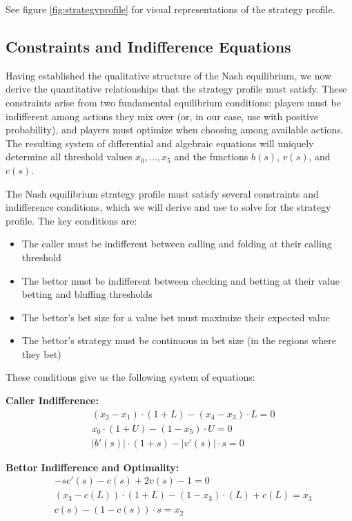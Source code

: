 \documentclass[../../main/main.tex]{subfiles}
\begin{document}
See figure \ref{fig:strategyprofile} for visual representations of the strategy profile.

\subsection{Constraints and Indifference Equations}
\label{subsec:constraints}

Having established the qualitative structure of the Nash equilibrium, we now derive the quantitative relationships that the strategy profile must satisfy. These constraints arise from two fundamental equilibrium conditions: players must be indifferent among actions they mix over (or, in our case, use with positive probability), and players must optimize when choosing among available actions. The resulting system of differential and algebraic equations will uniquely determine all threshold values $x_0, \ldots, x_5$ and the functions $b(s)$, $v(s)$, and $c(s)$.

The Nash equilibrium strategy profile must satisfy several constraints and indifference conditions, which we will derive and use to solve for the strategy profile. The key conditions are:

\begin{itemize}
    \item The caller must be indifferent between calling and folding at their calling threshold
    \item The bettor must be indifferent between checking and betting at their value betting and bluffing thresholds
    \item The bettor's bet size for a value bet must maximize their expected value
    \item The bettor's strategy must be continuous in bet size (in the regions where they bet)
\end{itemize}

These conditions give us the following system of equations: \label{eq:nash_equilibrium_system}

\textbf{Caller Indifference:}
\begin{align}
    & (x_2-x_1) \cdot (1+L) - (x_4-x_3) \cdot L = 0 \\
    & x_0 \cdot (1+U) - (1-x_5) \cdot U = 0\\
    & |b'(s)| \cdot (1 + s) - |v'(s)| \cdot s = 0
\end{align}

\textbf{Bettor Indifference and Optimality:}
\begin{align}
    & -sc'(s) - c(s) + 2 v(s) - 1 = 0 \label{eq:valueoptimality}\\
    & (x_3-c(L)) \cdot (1+L) - (1-x_3) \cdot (L) + c(L) = x_3 \label{eq:valueindiff}\\ 
    & c(s) - (1-c(s)) \cdot s = x_2 \label{eq:bluffindiff}
\end{align}
\end{document}
